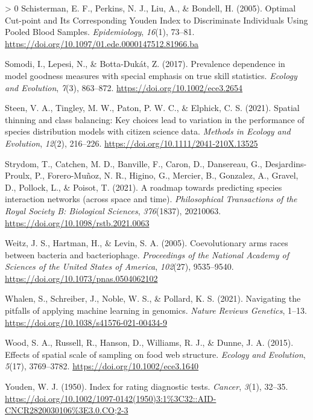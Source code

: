 \documentclass[10pt,oneside]{article}
\newlength{\cslhangindent}
\newenvironment{CSLReferences}[3] %
 {%
  \setlength{\parindent}{0pt}
  \ifodd #1 \everypar{\setlength{\hangindent}{\cslhangindent}}\ignorespaces\fi
  \ifnum #2 > 0
  \setlength{\parskip}{#2\baselineskip}
  \fi
 }%
 {}
\begin{document}
\begin{CSLReferences}{1}{0}
\leavevmode\hypertarget{ref-Schisterman2005OptCut}{}%
Schisterman, E. F., Perkins, N. J., Liu, A., \& Bondell, H. (2005).
Optimal Cut-point and Its Corresponding Youden Index to Discriminate
Individuals Using Pooled Blood Samples. \emph{Epidemiology},
\emph{16}(1), 73--81.
\url{https://doi.org/10.1097/01.ede.0000147512.81966.ba}

\leavevmode\hypertarget{ref-Somodi2017PreDep}{}%
Somodi, I., Lepesi, N., \& Botta-Dukát, Z. (2017). Prevalence dependence
in model goodness measures with special emphasis on true skill
statistics. \emph{Ecology and Evolution}, \emph{7}(3), 863--872.
\url{https://doi.org/10.1002/ece3.2654}

\leavevmode\hypertarget{ref-Steen2021SpaThi}{}%
Steen, V. A., Tingley, M. W., Paton, P. W. C., \& Elphick, C. S. (2021).
Spatial thinning and class balancing: Key choices lead to variation in
the performance of species distribution models with citizen science
data. \emph{Methods in Ecology and Evolution}, \emph{12}(2), 216--226.
\url{https://doi.org/10.1111/2041-210X.13525}

\leavevmode\hypertarget{ref-Strydom2021RoaPre}{}%
Strydom, T., Catchen, M. D., Banville, F., Caron, D., Dansereau, G.,
Desjardins-Proulx, P., Forero-Muñoz, N. R., Higino, G., Mercier, B.,
Gonzalez, A., Gravel, D., Pollock, L., \& Poisot, T. (2021). A roadmap
towards predicting species interaction networks (across space and time).
\emph{Philosophical Transactions of the Royal Society B: Biological
Sciences}, \emph{376}(1837), 20210063.
\url{https://doi.org/10.1098/rstb.2021.0063}

\leavevmode\hypertarget{ref-Weitz2005CoeArm}{}%
Weitz, J. S., Hartman, H., \& Levin, S. A. (2005). Coevolutionary arms
races between bacteria and bacteriophage. \emph{Proceedings of the
National Academy of Sciences of the United States of America},
\emph{102}(27), 9535--9540.
\url{https://doi.org/10.1073/pnas.0504062102}

\leavevmode\hypertarget{ref-Whalen2021NavPit}{}%
Whalen, S., Schreiber, J., Noble, W. S., \& Pollard, K. S. (2021).
Navigating the pitfalls of applying machine learning in genomics.
\emph{Nature Reviews Genetics}, 1--13.
\url{https://doi.org/10.1038/s41576-021-00434-9}

\leavevmode\hypertarget{ref-Wood2015EffSpa}{}%
Wood, S. A., Russell, R., Hanson, D., Williams, R. J., \& Dunne, J. A.
(2015). Effects of spatial scale of sampling on food web structure.
\emph{Ecology and Evolution}, \emph{5}(17), 3769--3782.
\url{https://doi.org/10.1002/ece3.1640}

\leavevmode\hypertarget{ref-Youden1950IndRat}{}%
Youden, W. J. (1950). Index for rating diagnostic tests. \emph{Cancer},
\emph{3}(1), 32--35.
\url{https://doi.org/10.1002/1097-0142(1950)3:1\%3C32::AID-CNCR2820030106\%3E3.0.CO;2-3}

\end{CSLReferences}
\end{document}
